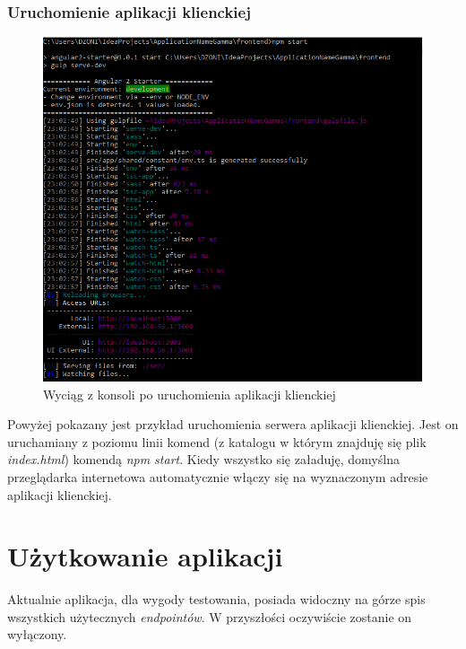 \documentclass[10pt,titlepage]{article} %
\begin{document}

\subsubsection{Uruchomienie aplikacji klienckiej}
\begin{figure}[H]
\caption[Wyciąg z konsoli po uruchomienia aplikacji klienckiej]{Wyciąg z konsoli po uruchomienia aplikacji klienckiej}
\includegraphics[width=1.0\textwidth, height=0.8\textheight]{img/sekcja3/frontend/uruchomienieSerwera}
\end{figure}

Powyżej pokazany jest przykład uruchomienia serwera aplikacji klienckiej. Jest on uruchamiany z poziomu linii komend (z katalogu w którym znajduję się plik \textit{index.html}) komendą \textit{npm start}. Kiedy wszystko się załaduję, domyślna przeglądarka internetowa automatycznie włączy się na wyznaczonym adresie aplikacji klienckiej.


\newpage
\section{Użytkowanie aplikacji}
Aktualnie aplikacja, dla wygody testowania, posiada widoczny na górze spis wszystkich użytecznych \textit{endpointów}. W przyszłości oczywiście zostanie on wyłączony.
\end{document}
